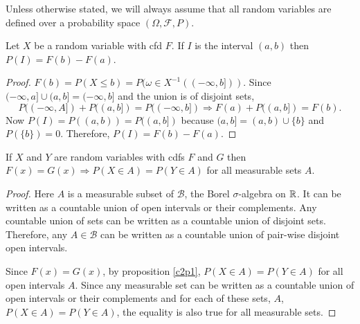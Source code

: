 \documentclass{article}
\begin{document}
Unless otherwise stated, we will always assume that all random variables are 
defined over a probability space $(\Omega, \mathcal{F}, P)$.
\begin{prop}\label{c2p1}
Let $X$ be a random variable with cfd $F$. If $I$ is the interval $(a, b)$ then
$P(I) = F(b) - F(a)$.
\end{prop}
\begin{proof}
$F(b) = P(X \le b) = P(\omega \in X^{-1}((-\infty, b]))$. Since $(-\infty, a]
\cup (a, b] = (-\infty, b]$ and the union is of disjoint sets,
\[
P((-\infty, A]) + P((a, b]) = P((-\infty, b]) \Rightarrow F(a) + P((a, b]) 
= F(b).
\]
Now $P(I) = P((a, b)) = P((a, b])$ because $(a, b] = (a, b) \cup \{b\}$ and 
$P(\{b\}) = 0$. Therefore, $P(I) = F(b) - F(a)$.
\end{proof}

\begin{thm}\label{c2t1}
If $X$ and $Y$ are random variables with cdfs $F$ and $G$ then $F(x) = G(x)
\Rightarrow P(X \in A) = P(Y \in A)$ for all measurable sets $A$. 
\end{thm}
\begin{proof}
Here $A$ is a measurable subset of $\mathcal{B}$, the Borel $\sigma$-algebra on
$\mathbb{R}$. It can be written as a countable union of open intervals or their 
complements. Any countable union of sets can be written as a countable union of
disjoint sets. Therefore, any $A \in \mathcal{B}$ can be written as a countable
union of pair-wise disjoint open intervals.

Since $F(x) = G(x)$, by proposition \ref{c2p1}, $P(X \in A) = P(Y \in A)$ for all
open intervals $A$. Since any measurable set can be written as a countable union
of open intervals or their complements and for each of these sets, $A$, 
$P(X \in A) = P(Y \in A)$, the equality is also true for all measurable sets.
\end{proof}
\end{document}

